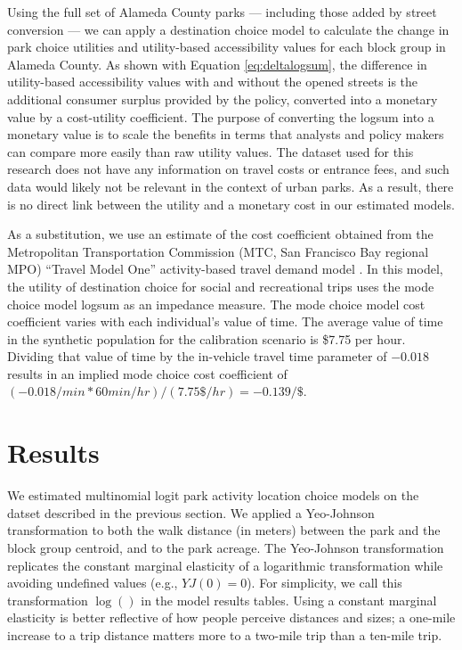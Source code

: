 \documentclass[3p, authoryear, review]{elsarticle} %
\begin{document}
Using the full set of Alameda County parks --- including those added by street
conversion --- we can apply a destination choice model to calculate the change in
park choice utilities and utility-based accessibility values for each block
group in Alameda County. As shown with Equation \eqref{eq:deltalogsum}, the
difference in utility-based accessibility values with and without the opened
streets is the additional consumer surplus provided by the policy, converted into a
monetary value by a cost-utility coefficient. The purpose of converting the logsum
into a monetary value is to scale the benefits in terms that analysts and
policy makers can compare
more easily than raw utility values. The dataset used for this research
does not have any information on travel costs or entrance fees, and such data
would likely not be relevant in the context of urban parks. As a result, there
is no direct link between the utility and a monetary cost in our estimated
models.

As a substitution, we use an estimate of the cost coefficient obtained from the
Metropolitan Transportation Commission (MTC, San Francisco Bay regional MPO)
``Travel Model One'' activity-based travel demand model \citep{mtctm1}. In this model,
the utility of destination choice for social and recreational trips uses
the mode choice model logsum as an impedance measure.
The mode choice model cost coefficient varies with each individual's value of time.
The average value of time in the synthetic population for the calibration
scenario is \$7.75 per hour. Dividing that value of time by the in-vehicle
travel time parameter of \(-0.018\) results in an implied mode choice cost coefficient of
\((-0.018 /min * 60 min / hr)/ (7.75 \$/hr) = -0.139 / \$\).

\hypertarget{results}{%
\section{Results}\label{results}}

We estimated multinomial logit park activity location choice models on the
datset described in the previous section. We applied a Yeo-Johnson
transformation \citep{Yeo2000} to both the walk distance (in meters) between the
park and the block group centroid, and to the park acreage. The Yeo-Johnson
transformation replicates the constant marginal elasticity of a logarithmic
transformation while avoiding undefined values (e.g., \(YJ(0) = 0\)). For
simplicity, we call this transformation \(\log()\) in the model results tables.
Using a constant marginal elasticity is better reflective of how people perceive
distances and sizes; a one-mile increase to a trip distance matters more to a
two-mile trip than a ten-mile trip.
\end{document}
